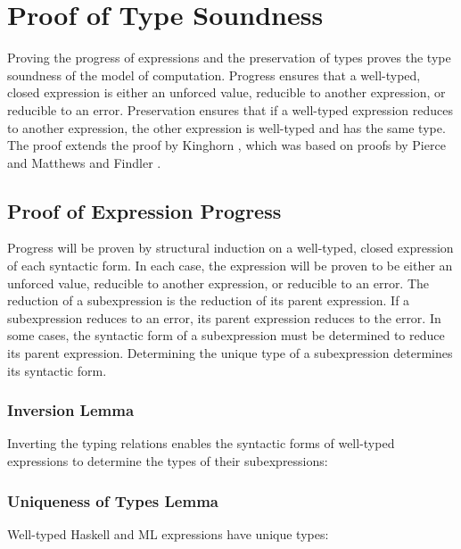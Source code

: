 \chapter{Proof of Type Soundness}

Proving the progress of expressions and the preservation of types proves the type soundness of the model of computation.  Progress ensures that a well-typed, closed expression is either an unforced value, reducible to another expression, or reducible to an error.  Preservation ensures that if a well-typed expression reduces to another expression, the other expression is well-typed and has the same type.  The proof extends the proof by Kinghorn \cite{kinghorn07}, which was based on proofs by Pierce \cite{pierce02} and Matthews and Findler \cite{matthews07}.

\section{Proof of Expression Progress}

Progress will be proven by structural induction on a well-typed, closed expression of each syntactic form.  In each case, the expression will be proven to be either an unforced value, reducible to another expression, or reducible to an error.  The reduction of a subexpression is the reduction of its parent expression.  If a subexpression reduces to an error, its parent expression reduces to the error.  In some cases, the syntactic form of a subexpression must be determined to reduce its parent expression.  Determining the unique type of a subexpression determines its syntactic form.

\subsection{Inversion Lemma}

Inverting the typing relations enables the syntactic forms of well-typed expressions to determine the types of their subexpressions:



\subsection{Uniqueness of Types Lemma}

Well-typed Haskell and ML expressions have unique types:



